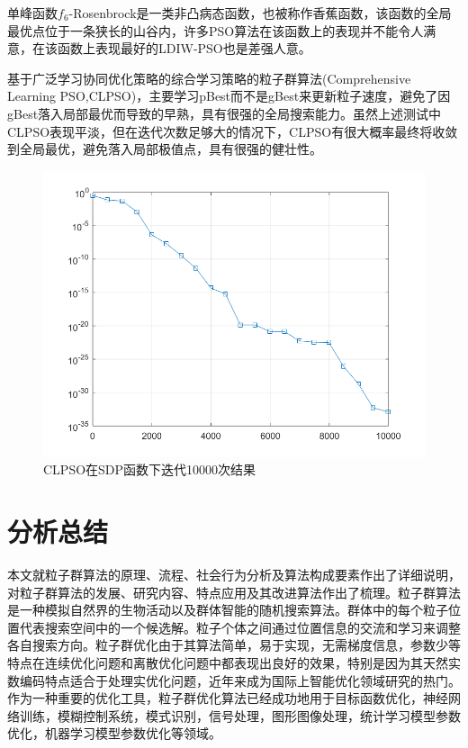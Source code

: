 单峰函数$f_6$-Rosenbrock是一类非凸病态函数，也被称作香蕉函数，该函数的全局最优点位于一条狭长的山谷内，许多PSO算法在该函数上的表现并不能令人满意，在该函数上表现最好的LDIW-PSO也是差强人意。

基于广泛学习协同优化策略的综合学习策略的粒子群算法(Comprehensive Learning PSO,CLPSO)，主要学习pBest而不是gBest来更新粒子速度，避免了因gBest落入局部最优而导致的早熟，具有很强的全局搜索能力。虽然上述测试中CLPSO表现平淡，但在迭代次数足够大的情况下，CLPSO有很大概率最终将收敛到全局最优，避免落入局部极值点，具有很强的健壮性。

\begin{figure}[ht]
	\centering
	\includegraphics[width=\linewidth]{pic/10000}
	\caption{CLPSO在SDP函数下迭代10000次结果}
\end{figure}

\section{分析总结}
本文就粒子群算法的原理、流程、社会行为分析及算法构成要素作出了详细说明，对粒子群算法的发展、研究内容、特点应用及其改进算法作出了梳理。粒子群算法是一种模拟自然界的生物活动以及群体智能的随机搜索算法。群体中的每个粒子位置代表搜索空间中的一个候选解。粒子个体之间通过位置信息的交流和学习来调整各自搜索方向。粒子群优化由于其算法简单，易于实现，无需梯度信息，参数少等特点在连续优化问题和离散优化问题中都表现出良好的效果，特别是因为其天然实数编码特点适合于处理实优化问题，近年来成为国际上智能优化领域研究的热门。作为一种重要的优化工具，粒子群优化算法已经成功地用于目标函数优化，神经网络训练，模糊控制系统，模式识别，信号处理，图形图像处理，统计学习模型参数优化，机器学习模型参数优化等领域。

